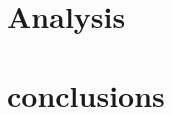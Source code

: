 \documentclass[10pt, twocolumn]{article}
\begin{document}
\section{Analysis}


\section{conclusions}




\end{document}
